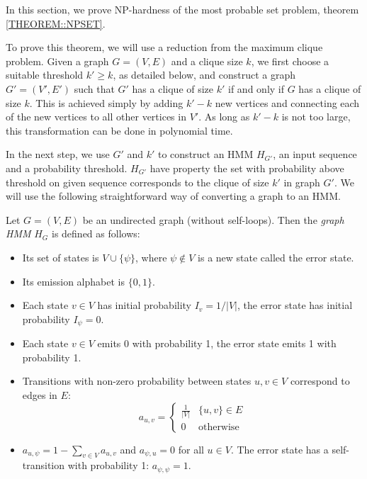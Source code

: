 In this section, we prove NP-hardness of the most probable set problem, theorem \ref{THEOREM::NPSET}.

To prove this theorem, we will use a reduction from the maximum clique
problem.  Given a graph $G=(V,E)$ and a clique
size $k$, we first choose a suitable threshold $k'\ge k$, as
detailed below, and construct a graph $G'=(V',E')$ such that $G'$ has
a clique of size $k'$ if and only if $G$ has a clique of size
$k$. This is achieved simply by adding $k'-k$ new vertices and
connecting each of the new vertices to all other vertices in $V'$.
As long as $k'-k$ is not too large, this transformation can be done in
polynomial time.

In the next step, we use $G'$ and $k'$ to construct an HMM $H_{G'}$, an input
sequence and a probability threshold. $H_{G'}$ have property the set with
probability above threshold on given sequence corresponds to the clique of size
$k'$ in graph $G'$. We will use the following
straightforward way of converting a graph to an HMM.

\begin{definition}\label{GraphHMM}
Let $G=(V,E)$ be an undirected graph (without self-loops). 
Then the \emph{graph HMM} $H_G$ is defined as follows:
\begin{itemize}
\item Its set of states is $V\cup \{\psi\}$, where $\psi\notin V$ is a
  new state called the error state.
\item Its emission alphabet is $\{0,1\}$.
\item Each state $v\in V$ has initial probability $I_{v} = 1/|V|$, the
error state has initial probability $I_{\psi}=0$.
\item Each state $v\in V$ emits 0 with probability 1, the error state emits 1 
with probability 1.
\item Transitions with non-zero probability between states $u,v\in V$
  correspond to edges in $E$:
$$a_{u,v}=\begin{cases}
\frac1{|V|} & \{u,v\}\in E\\
0 & \text{otherwise}
\end{cases}$$
\item $a_{u,\psi}=1-\sum_{v\in V}a_{u,v}$
and $a_{\psi,u}=0$ for all $u\in V$. The error state has a self-transition with
probability 1: $a_{\psi,\psi}=1$.
\end{itemize}
\end{definition}

